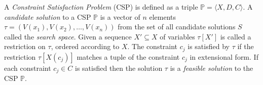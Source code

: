 A \emph{Constraint Satisfaction Problem} (CSP) is defined as a triple $\mathbb{P} = \langle X,D,C \rangle$. A 
\emph{candidate solution} to a CSP $\mathbb{P}$ is a vector of $n$ elements \\
$\tau = (V(x_1), V(x_2), \dots , V(x_n))$ from the set of all candidate solutions $S$ called the \emph{search space}.  
Given a sequence $X' \subseteq X$ of variables $\tau[X']$ is called a restriction on $\tau$, ordered according to 
$X$. The constraint $c_j$ is satisfied by $\tau$ if the restriction $\tau[X(c_j)]$ matches a tuple of the constraint 
$c_j$ in extensional form. If each constraint $c_j \in C$ is satisfied then the solution $\tau$ is a \emph{feasible 
solution} to the CSP $\mathbb{P}$. \\

